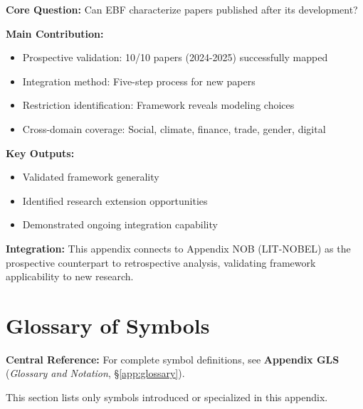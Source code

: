 \begin{tcolorbox}[colback=green!10!white, colframe=green!75!black,
    title=\textbf{Appendix REC: Summary}]

\textbf{Core Question:} Can EBF characterize papers published after its
development?

\textbf{Main Contribution:}
\begin{itemize}[nosep]
    \item Prospective validation: 10/10 papers (2024-2025) successfully mapped
    \item Integration method: Five-step process for new papers
    \item Restriction identification: Framework reveals modeling choices
    \item Cross-domain coverage: Social, climate, finance, trade, gender, digital
\end{itemize}

\textbf{Key Outputs:}
\begin{itemize}[nosep]
    \item Validated framework generality
    \item Identified research extension opportunities
    \item Demonstrated ongoing integration capability
\end{itemize}

\textbf{Integration:} This appendix connects to Appendix NOB (LIT-NOBEL) as
the prospective counterpart to retrospective analysis, validating framework
applicability to new research.

\end{tcolorbox}


\section{Glossary of Symbols}
\label{sec:J-glossary}

\begin{tcolorbox}[colback=blue!5!white, colframe=blue!75!black]
\textbf{Central Reference:} For complete symbol definitions, see
\textbf{Appendix GLS} (\textit{Glossary and Notation}, \S\ref{app:glossary}).

This section lists only symbols introduced or specialized in this appendix.
\end{tcolorbox}

